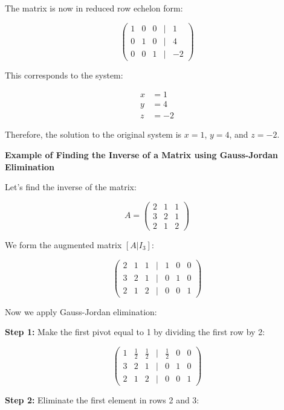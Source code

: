 The matrix is now in reduced row echelon form:

\[
    \begin{pmatrix}
    1 & 0 & 0 & | & 1 \\
    0 & 1 & 0 & | & 4 \\
    0 & 0 & 1 & | & -2
    \end{pmatrix}
\]

This corresponds to the system:

\begin{align*}
    x &= 1 \\
    y &= 4 \\
    z &= -2
\end{align*}

Therefore, the solution to the original system is \(x = 1\), \(y = 4\), and \(z = -2\).
\vspace{\baselineskip}

\textbf{Example of Finding the Inverse of a Matrix using Gauss-Jordan Elimination}
\vspace{\baselineskip}

Let's find the inverse of the matrix:

\[
    A = 
    \begin{pmatrix}
    2 & 1 & 1 \\
    3 & 2 & 1 \\
    2 & 1 & 2
    \end{pmatrix}
\]

We form the augmented matrix \([A|I_3]\):

\[
    \begin{pmatrix}
    2 & 1 & 1 & | & 1 & 0 & 0 \\
    3 & 2 & 1 & | & 0 & 1 & 0 \\
    2 & 1 & 2 & | & 0 & 0 & 1
    \end{pmatrix}
\]

Now we apply Gauss-Jordan elimination:
\vspace{\baselineskip}

\textbf{Step 1:} Make the first pivot equal to 1 by dividing the first row by 2:

\[
    \begin{pmatrix}
    1 & \frac{1}{2} & \frac{1}{2} & | & \frac{1}{2} & 0 & 0 \\
    3 & 2 & 1 & | & 0 & 1 & 0 \\
    2 & 1 & 2 & | & 0 & 0 & 1
    \end{pmatrix}
\]

\textbf{Step 2:} Eliminate the first element in rows 2 and 3:

